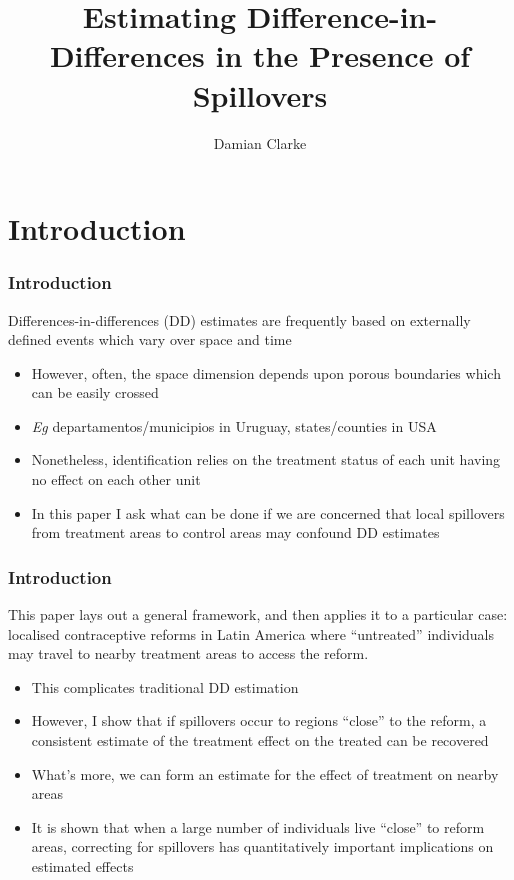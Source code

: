 \documentclass[10pt,letterpaper,subeqn]{beamer}
\title{Estimating Difference-in-Differences in the Presence of Spillovers}
\author{Damian Clarke\inst{\dag} }
\institute{\inst{\dag}  University of Oxford}
\date{}
\begin{document}
\begin{frame}
\titlepage
\end{frame}

\section{Introduction}
\begin{frame}[label=int1]
  \frametitle{Introduction}
Differences-in-differences (DD) estimates are frequently based on externally
defined events which vary over space and time
\vspace{7mm}
\begin{itemize}
\item However, often, the space dimension depends upon porous boundaries 
which can be easily crossed
\item \emph{Eg} departamentos/municipios in Uruguay, states/counties in USA
\item Nonetheless, identification relies on the treatment status of each unit
having no effect on each other unit
\item In this paper I ask what can be done if we are concerned that local 
spillovers from treatment areas to control areas may confound DD estimates
\end{itemize}
\end{frame}


\begin{frame}[label=int2]
  \frametitle{Introduction}
This paper lays out a general framework, and then applies it to a particular 
case: localised contraceptive reforms in Latin America where ``untreated'' 
individuals may travel to nearby treatment areas to access the reform.
\vspace{5mm}
\begin{itemize}
\item This complicates traditional DD estimation
\item However, I show that if spillovers occur to regions ``close'' to the
reform, a consistent estimate of the treatment effect on the treated can be
recovered
\item What's more, we can form an estimate for the effect of treatment on
nearby areas
\item It is shown that when a large number of individuals live ``close'' to 
reform areas, correcting for spillovers has quantitatively important implications 
on estimated effects
\end{itemize}
\end{frame}
\end{document}
